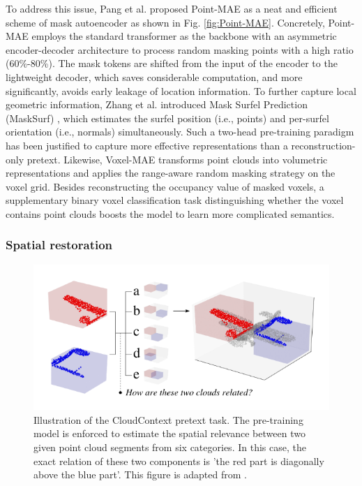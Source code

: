 \documentclass[a4paper,fleqn]{cas-dc}
\begin{document}
To address this issue, Pang et al. proposed Point-MAE \citep{pang2022masked} as a neat and efficient scheme of mask autoencoder as shown in Fig. \ref{fig:Point-MAE}. Concretely, Point-MAE employs the standard transformer as the backbone with an asymmetric encoder-decoder architecture to process random masking points with a high ratio (60\%-80\%). The mask tokens are shifted from the input of the encoder to the lightweight decoder, which saves considerable computation, and more significantly, avoids early leakage of location information. To further capture local geometric information, Zhang et al. introduced Mask Surfel Prediction (MaskSurf) \citep{zhang2022masked}, which estimates the surfel position (i.e., points) and per-surfel orientation (i.e., normals) simultaneously. Such a two-head pre-training paradigm has been justified to capture more effective representations than a reconstruction-only pretext. Likewise, Voxel-MAE \citep{min2022voxel} transforms point clouds into volumetric representations and applies the range-aware random masking strategy on the voxel grid. Besides reconstructing the occupancy value of masked voxels, a supplementary binary voxel classification task distinguishing whether the voxel contains point clouds boosts the model to learn more complicated semantics.


\subsubsection{Spatial restoration}

\begin{figure}[htbp]
    \centering
    \includegraphics[width=0.97\linewidth]{CloudContext.png}
    \caption{Illustration of the CloudContext pretext task. The pre-training model is enforced to estimate the spatial relevance between two given point cloud segments from six categories. In this case, the exact relation of these two components is 'the red part is diagonally above the blue part'. This figure is adapted from \citep{sauder2019context}.}
    \label{fig:CloudContext}
\end{figure}
\end{document}
